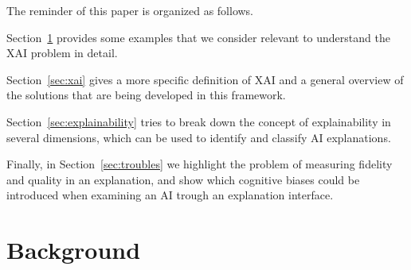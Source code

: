 \documentclass[conference]{IEEEtran}
\newcommand{\cit}[1][]{\todo[tickmarkheight=0.2cm]{cit #1}}
\begin{document}

The reminder of this paper is organized as follows.

Section~\ref{sec:background} provides some examples that we consider relevant to understand the XAI problem in detail.

Section~\ref{sec:xai} gives a more specific definition of XAI and a general
overview of the solutions that are being developed in this framework.

Section~\ref{sec:explainability} tries to break down the concept of explainability in several dimensions, which can be used to identify and classify AI explanations.

Finally, in Section~\ref{sec:troubles} we highlight the problem of measuring fidelity and quality in an explanation, and show which cognitive biases could be introduced when examining an AI trough an explanation interface.

\section{Background}
\label{sec:background}





\end{document}
